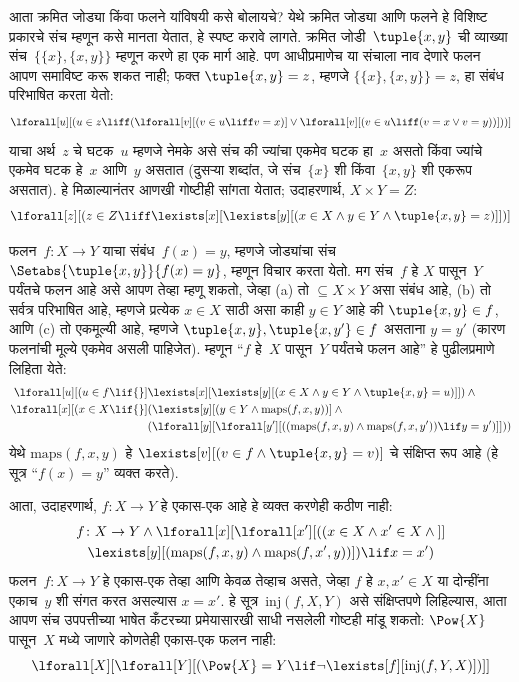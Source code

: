 आता क्रमित जोड्या किंवा फलने यांविषयी कसे बोलायचे? येथे क्रमित जोड्या आणि
फलने हे विशिष्ट प्रकारचे संच म्हणून कसे मानता येतात, हे स्पष्ट करावे लागते.
क्रमित जोडी~$\tuple{x, y}$ ची व्याख्या संच~$\{\{x\}, \{x, y\}\}$ म्हणून
करणे हा एक मार्ग आहे. पण आधीप्रमाणेच या संचाला नाव देणारे फलन
आपण समाविष्ट करू शकत नाही; फक्त $\tuple{x, y} = z$, म्हणजे
$\{\{x\}, \{x, y\}\} = z$, हा संबंध परिभाषित करता येतो:
\[\lforall[u][(u \in z \liff (\lforall[v][(v \in u \liff v = x)] \lor
  \lforall[v][(v \in u \liff (v = x \lor v = y))]))]
\]
याचा अर्थ~$z$ चे घटक~$u$ म्हणजे नेमके असे संच की ज्यांचा एकमेव
घटक हा~$x$ असतो किंवा ज्यांचे एकमेव घटक हे~$x$ आणि~$y$
असतात (दुसऱ्या शब्दांत, जे संच~$\{x\}$ शी किंवा~$\{x, y\}$ शी एकरूप
असतात). हे मिळाल्यानंतर आणखी गोष्टीही सांगता येतात; उदाहरणार्थ,
$X \times Y = Z$:
\[\lforall[z][(z \in Z \liff \lexists[x][\lexists[y][(x \in
        X \land y \in Y \land \tuple{x, y} = z)]])]
\]

फलन~$f \colon X \to Y$ याचा संबंध~$f(x) = y$, म्हणजे जोड्यांचा संच
$\Setabs{\tuple{x,y}}{f(x) = y}$, म्हणून विचार करता येतो. मग संच~$f$ हे
$X$ पासून~$Y$ पर्यंतचे फलन आहे असे आपण तेव्हा म्हणू शकतो, जेव्हा (a) तो
$\subseteq X \times Y$ असा संबंध आहे, (b) तो सर्वत्र परिभाषित आहे,
म्हणजे प्रत्येक $x \in X$ साठी असा काही $y \in Y$ आहे की
$\tuple{x, y} \in f$, आणि (c) तो एकमूल्यी आहे, म्हणजे
$\tuple{x, y}, \tuple{x, y'} \in f$ असताना $y = y'$ (कारण फलनांची मूल्ये
एकमेव असली पाहिजेत). म्हणून ``$f$ हे~$X$ पासून~$Y$ पर्यंतचे फलन आहे'' हे
पुढीलप्रमाणे लिहिता येते:
\begin{align*}
 \lforall[u][(u \in f \lif {}] & \lexists[x][\lexists[y][(x \in X \land y \in
      Y \land \tuple{x, y} = u)]]) \land {}\\
 \lforall[x][(x \in X \lif {}] &
      (\lexists[y][(y \in Y \land \mathrm{maps}(f, x, y))] \land {}\\
& (\lforall[y][\lforall[y'][((\mathrm{maps}(f, x, y) \land
    \mathrm{maps}(f, x, y')) \lif y = y')]]))
\end{align*}
येथे $\mathrm{maps}(f, x, y)$ हे $\lexists[v][(v \in f \land
  \tuple{x, y} = v)]$ चे संक्षिप्त रूप आहे (हे सूत्र ``$f(x) = y$''
व्यक्त करते).

आता, उदाहरणार्थ, $f\colon X \to Y$ हे एकास-एक आहे हे व्यक्त करणेही
कठीण नाही:
\begin{multline*}
 f \colon X \to Y \land \lforall[x][\lforall[x'][((x \in X \land x' \in
     X \land {}]] \\
 \lexists[y][(\mathrm{maps}(f, x, y) \land \mathrm{maps}(f,
        x', y))]) \lif x = x')
\end{multline*}
फलन~$f\colon X \to Y$ हे एकास-एक तेव्हा आणि केवळ तेव्हाच असते, जेव्हा
$f$ हे $x, x' \in X$ या दोन्हींना एकाच~$y$ शी संगत करत असल्यास $x = x'$.
हे सूत्र~$\mathrm{inj}(f, X, Y)$ असे संक्षिप्तपणे लिहिल्यास, आता आपण संच
उपपत्तीच्या भाषेत कँटरच्या प्रमेयासारखी साधी नसलेली गोष्टही मांडू शकतो:
$\Pow{X}$ पासून~$X$ मध्ये जाणारे कोणतेही एकास-एक फलन नाही:
\[\lforall[X][\lforall[Y][(\Pow{X} = Y \lif
    \lnot\lexists[f][\mathrm{inj}(f, Y, X)])]]
\]


